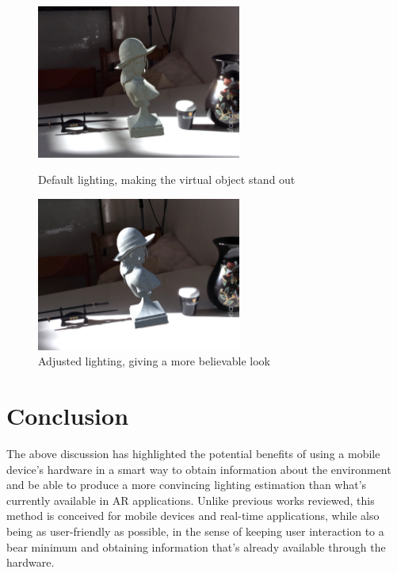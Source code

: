 \documentclass{article}
\begin{document}
\begin{figure}
\centering
\includegraphics[width=0.6\textwidth]{Figures/fake.jpg}
\caption{Default lighting, making the virtual object stand out}
\includegraphics[width=0.6\textwidth]{Figures/realish.jpg}
\caption{Adjusted lighting, giving a more believable look}
\end{figure}


\clearpage

\section{Conclusion}
The above discussion has highlighted the potential benefits of using a mobile device's hardware in a smart way to obtain information about the environment and be able to produce a more convincing lighting estimation than what's currently available in AR applications. Unlike previous works reviewed, this method is conceived for mobile devices and real-time applications, while also being as user-friendly as possible, in the sense of keeping user interaction to a bear minimum and obtaining information that's already available through the hardware. 


\nocite{*}

\end{document}
